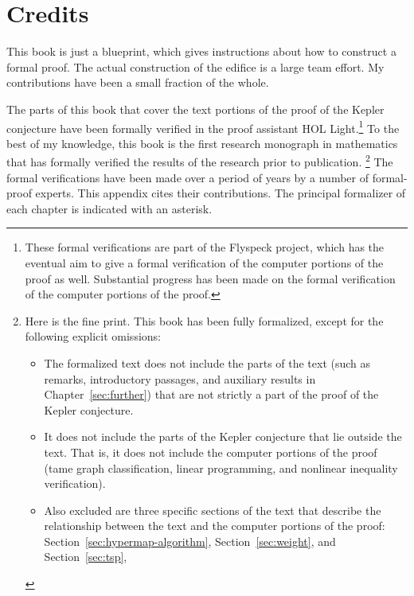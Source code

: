 
\chapter{Credits}\label{sec:credit}

This book is just a blueprint, which gives instructions about how to
construct a formal proof.  The actual construction of the edifice is a
large team effort.  My contributions have been a small fraction of the
whole.

The parts of this book that cover the text portions of the proof of
the Kepler conjecture have been formally verified in the proof
assistant HOL Light.\footnote{These formal verifications are part of
  the Flyspeck project, which has the eventual aim to give a formal
  verification of the computer portions of the proof as
  well. Substantial progress has been made on the formal verification
  of the computer portions of the proof.} 
To the best of my knowledge, this book is the first research monograph in mathematics
that has formally verified the results of the research
prior to publication.  %
\footnote{ Here is the fine print.  This book has been fully
  formalized, except for the following explicit omissions:
\begin{itemize}
\item The formalized text does not include the parts of the text (such
  as remarks, introductory passages, and auxiliary results in 
  Chapter~\ref{sec:further}) that are
  not strictly a part of the proof of the Kepler conjecture.
\item It does not include the parts of the Kepler conjecture that lie
  outside the text. That is, it does not include the computer portions
  of the proof (tame graph classification, linear programming, and
  nonlinear inequality verification).
\item Also excluded are three specific sections of the text that describe
  the relationship between the text and the computer portions of
  the proof: Section~\ref{sec:hypermap-algorithm}, Section~\ref{sec:weight}, and Section~\ref{sec:tsp},
\end{itemize}
}
 The formal verifications
have been made over a period of years by a number of formal-proof
experts.  This appendix cites their contributions. The principal
formalizer of each chapter is indicated with an asterisk.

